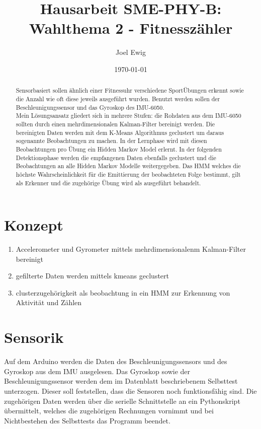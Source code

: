 \documentclass{article}
\begin{document}
\title{Hausarbeit SME-PHY-B: Wahlthema 2 - Fitnesszähler}
\author{Joel Ewig}
\date{\today}
\maketitle
\clearpage

\begin{abstract}
Sensorbasiert sollen ähnlich einer Fitnessuhr verschiedene SportÜbungen erkennt sowie die Anzahl wie oft diese jeweils ausgeführt wurden.
Benutzt werden sollen der Beschleunigungssensor und das Gyroskop des IMU-6050.\\
Mein Lösungsansatz gliedert sich in mehrere Stufen:
die Rohdaten aus dem IMU-6050 sollten durch einen mehrdimensionalen Kalman-Filter bereinigt werden.
Die bereinigten Daten werden mit dem K-Means Algorithmus geclustert um daraus sogenannte \glqq{}Beobachtungen\grqq{} zu machen.
In der Lernphase wird mit diesen Beobachtungen pro Übung ein Hidden Markov Model erlernt.
In der folgenden Detektionsphase werden die empfangenen Daten ebenfalls geclustert und die Beobachtungen an alle Hidden Markov Modelle weitergegeben.
Das HMM welches die höchste Wahrscheinlichkeit für die Emittierung der beobachteten Folge bestimmt, gilt als Erkenner und die zugehörige Übung wird als ausgeführt behandelt.
\end{abstract}
\clearpage

\tableofcontents
\clearpage

\section{Konzept}
\begin{enumerate}
\item Accelerometer und Gyrometer mittels mehrdimensionalenm Kalman-Filter bereinigt
\item gefilterte Daten werden mittels kmeans geclustert
\item clusterzugehörigkeit als beobachtung in ein HMM zur Erkennung von Aktivität und Zählen
\end{enumerate}

\section{Sensorik}
Auf dem Arduino werden die Daten des Beschleunigungssensors und des Gyroskop aus dem IMU ausgelesen.
Das Gyroskop sowie der Beschleunigungssensor werden dem im Datenblatt beschriebenem Selbsttest unterzogen.
Dieser soll feststellen, dass die Sensoren noch funktionsfähig sind.
Die zugehörigen Daten werden über die serielle Schnittstelle an ein Pythonskript übermittelt, welches die zugehörigen Rechnungen vornimmt und bei Nichtbestehen des Selbsttests das Programm beendet.
\end{document}
